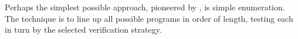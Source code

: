 \documentclass[12pt,twoside]{reedthesis}
\begin{document}
Perhaps the simplest possible approach, pioneered by \cite{massalin1987superoptimizer}, is simple enumeration. 
The technique is to line up all possible programs in order of length, testing each in turn by the selected verification strategy. 

\end{document}
